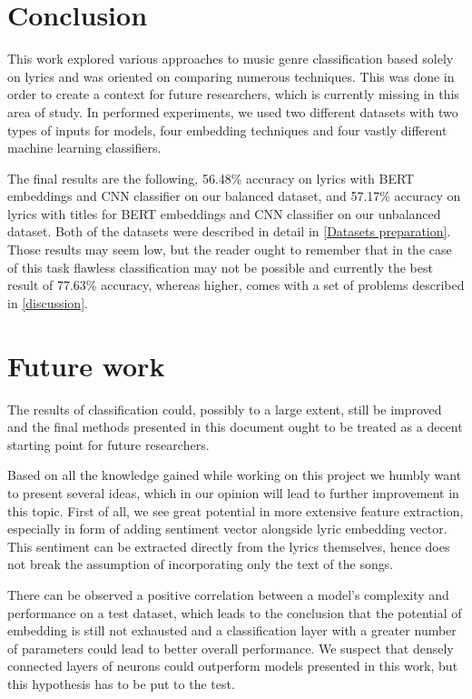 \section{Conclusion}\label{conclusion}

This work explored various approaches to music genre classification based solely on lyrics and was oriented on comparing numerous techniques. This was done in order to create a context for future researchers, which is currently missing in this area of study. In performed experiments, we used two different datasets with two types of inputs for models, four embedding techniques and four vastly different machine learning classifiers.

The final results are the following, 56.48\% accuracy on lyrics with BERT embeddings and CNN classifier on our balanced dataset, and 57.17\% accuracy on lyrics with titles for BERT embeddings and CNN classifier on our unbalanced dataset. Both of the datasets were described in detail in \ref{Datasets preparation}. Those results may seem low, but the reader ought to remember that in the case of this task flawless classification may not be possible and currently the best result of 77.63\% accuracy, whereas higher, comes with a set of problems described in \ref{discussion}.

\section{Future work}\label{future_work}
The results of classification could, possibly to a large extent, still be improved and the final methods presented in this document ought to be treated as a decent starting point for future researchers. 

Based on all the knowledge gained while working on this project we humbly want to present several ideas, which in our opinion will lead to further improvement in this topic. First of all, we see great potential in more extensive feature extraction, especially in form of adding sentiment vector alongside lyric embedding vector. This sentiment can be extracted directly from the lyrics themselves, hence does not break the assumption of incorporating only the text of the songs. 

There can be observed a positive correlation between a model's complexity and performance on a test dataset, which leads to the conclusion that the potential of embedding is still not exhausted and a classification layer with a greater number of parameters could lead to better overall performance. We suspect that densely connected layers of neurons could outperform models presented in this work, but this hypothesis has to be put to the test.

